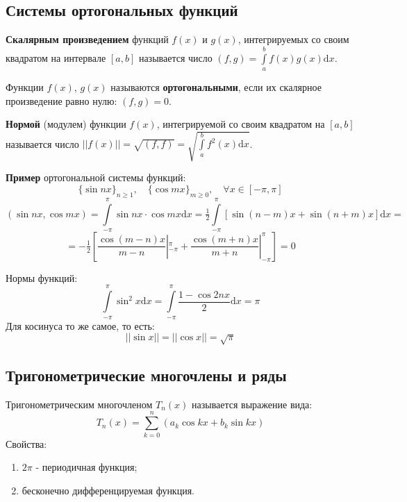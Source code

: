 \documentclass[12pt, a4paper]{article}
\newcommand{\di}{\mathrm{d}}
\begin{document}
\subsection{Системы ортогональных функций}

\textbf{Скалярным произведением} функций $f(x)$ и $g(x)$, интегрируемых со своим квадратом на интервале $[a, b]$ называется число $(f, g) = \int \limits_a^b f(x)g(x) \di x$.

Функции $f(x)$, $g(x)$ называются \textbf{ортогональными}, если их скалярное произведение равно нулю: $(f, g) = 0$.

\textbf{Нормой} (модулем) функции $f(x)$, интегрируемой со своим квадратом на $[a, b]$ называется число $||f(x)|| = \sqrt{(f, f)} = \sqrt{\int \limits_a^b f^2(x) \di x}$.


\textbf{Пример} ортогональной системы функций:
\[\{\sin nx \}_{n \geq 1}, \quad \{\cos mx \}_{m \geq 0}, \quad \forall x \in [-\pi, \pi] \]
\[(\sin nx, \cos mx) = \int \limits_{-\pi}^{\pi} \sin nx \cdot \cos mx \di x = \tfrac{1}{2} \int \limits_{-\pi}^{\pi} [\sin (n-m)x + \sin (n+m)x] \di x = \]
\[= -\tfrac{1}{2} \left[\frac{\cos (m-n)x}{m-n} |^{\pi}_{-\pi} + \frac{\cos (m+n)x}{m+n} |^{\pi}_{-\pi}\right] = 0 \]

Нормы функций:
\[\int \limits_{-\pi}^{\pi} \sin^2 x \di x = \int \limits_{-\pi}^{\pi} \frac{1-\cos 2nx}{2} \di x = \pi \]
Для косинуса то же самое, то есть:
\[||\sin x|| = ||\cos x|| = \sqrt{\pi} \]

\subsection{Тригонометрические многочлены и ряды}

Тригонометрическим многочленом $T_n(x)$ называется выражение вида:
\[T_n(x) = \sum_{k=0}^n (a_k \cos kx + b_k \sin kx) \]
Свойства:
\begin{enumerate}
 \item $2\pi$ - периодичная функция;
 \item бесконечно дифференцируемая функция.
\end{enumerate}
\end{document}
